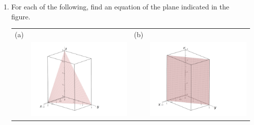 \documentclass[12pt]{article}
\newif\ifans
\begin{document}
\begin{enumerate}

\item For each of the following, find an equation of the plane indicated in the figure.

\begin{tabular}{cccc}
(a)& & (b)&\\
&\includegraphics[scale=0.35]{plane2.pdf}&&\includegraphics[scale=0.35]{plane1.pdf}
\end{tabular}

\ifans{\fbox{(a) $6x+4y+3z=12$; (b) $3x+2y=6$}} \fi

\end{enumerate}
\end{document}
